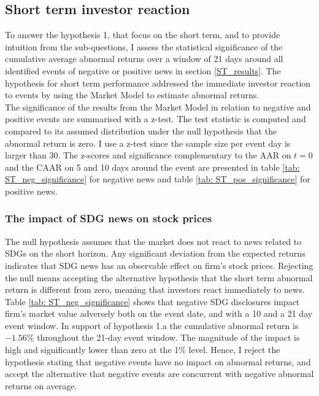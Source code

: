 
\subsection{Short term investor reaction} 
To answer the hypothesis 1, that focus on the short term, and to provide intuition from the sub-questions, I assess the statistical significance of the cumulative average abnormal returns over a window of 21 days around all identified events of negative or positive news in section \ref{ST_results}. The hypothesis for short term performance addressed the immediate investor reaction to events by using the Market Model to estimate abnormal returns. \\

The significance of the results from the Market Model in relation to negative and positive events are summarised with a z-test. The test statistic is computed and compared to its assumed distribution under the null hypothesis that the abnormal return is zero. I use a z-test since the sample size per event day is larger than 30. The z-scores and significance complementary to the AAR on $t=0$ and the CAAR on 5 and 10 days around the event are presented in table \ref{tab: ST_neg_significance} for negative news and table \ref{tab: ST_pos_significance} for positive news.  

\subsubsection{The impact of SDG news on stock prices }

The null hypothesis assumes that the market does not react to news related to SDGs on the short horizon. Any significant deviation from the expected returns indicates that SDG news has an observable effect on firm's stock prices.  Rejecting the null means accepting the alternative hypothesis that the short term abnormal return is different from zero, meaning that investors react immediately to news. \\
 
Table \ref{tab: ST_neg_significance} shows that negative SDG disclosures impact firm's market value adversely both on the event date, and with a 10 and a 21 day event window. In support of hypothesis 1.a the cumulative abnormal return is $-1.56\%$ throughout the 21-day event window. The magnitude of the impact is high and significantly lower than zero at the 1\% level. Hence, I reject the hypothesis stating that negative events have no impact on abnormal returns, and accept the alternative that negative events are concurrent with negative abnormal returns on average. 

